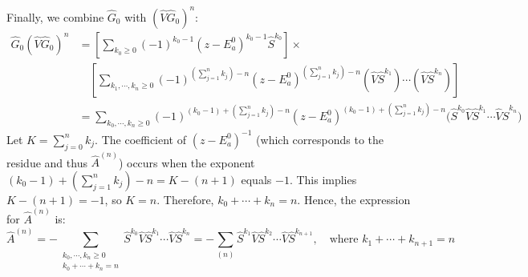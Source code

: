 Finally, we combine $\hat G_0$ with $(\hat V \hat G_0)^n$:
\begin{align} \label{eq:G0_V_G0_n_expansion}
    \hat G_0(\hat V \hat G_0)^n
    &=\left[\sum_{k_0\ge 0}(-1)^{k_0-1}(z-E_a^0)^{k_0-1}\hat
    S^{k_0}\right] \times \\
    &\quad \left[\sum_{k_1,\cdots,k_n\ge 0}
        (-1)^{\left(\sum_{j=1}^{n}k_j\right)-n}
        (z-E_a^0)^{\left(\sum_{j=1}^{n}k_j\right)-n}
    (\hat V \hat S^{k_1})\cdots(\hat V \hat S^{k_n})\right] \\
    &=\sum_{k_0,\cdots,k_n\ge 0}
    (-1)^{(k_0-1)+\left(\sum_{j=1}^{n}k_j\right)-n}
    (z-E_a^0)^{(k_0-1)+\left(\sum_{j=1}^{n}k_j\right)-n}
    \big(\hat S^{k_0} \hat V \hat S^{k_1}\cdots \hat V \hat S^{k_n}\big)
\end{align}
Let $K=\sum_{j=0}^{n}k_j$. The coefficient of $(z-E_a^0)^{-1}$ (which
corresponds to the residue and thus $\hat A^{(n)}$) occurs when the
exponent $(k_0-1)+\left(\sum_{j=1}^{n}k_j\right)-n = K - (n+1)$ equals $-1$.
This implies $K - (n+1) = -1$, so $K = n$.
Therefore, $k_0+\cdots+k_n=n$.
Hence, the expression for $\hat A^{(n)}$ is:
\begin{equation} \label{eq:A_n_final}
    \hat A^{(n)}
    =-\sum_{\substack{k_0,\cdots,k_n\ge 0\\ k_0+\cdots+k_n=n}}
    \hat S^{k_0} \hat V \hat S^{k_1}\cdots \hat V \hat S^{k_n}
    = - \sum_{(n)} \hat S^{k_1} \hat V \hat S^{k_2}\cdots \hat V \hat
    S^{k_{n+1}},
    \quad \text{where } k_1+\cdots+k_{n+1}=n
\end{equation}


